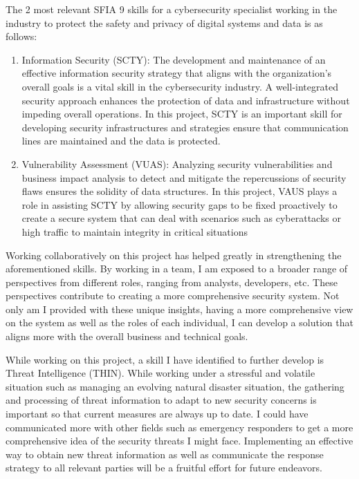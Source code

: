 \documentclass[a4paper, 11pt]{report}
\begin{document}
\begin{enumerate}
The 2 most relevant SFIA 9 skills for a cybersecurity specialist working in the industry to protect the safety and privacy of digital systems and data is as follows:

\begin{enumerate}

	\item Information Security (SCTY): The development and maintenance of an effective information security strategy that aligns with the organization's overall goals is a vital skill in the cybersecurity industry. A well-integrated security approach enhances the protection of data and infrastructure without impeding overall operations. In this project, SCTY is an important skill for developing security infrastructures and strategies ensure that communication lines are maintained and the data is protected.

	\item Vulnerability Assessment (VUAS): Analyzing security vulnerabilities and business impact analysis to detect and mitigate the repercussions of security flaws ensures the solidity of data structures. In this project, VAUS plays a role in assisting SCTY by allowing security gaps to be fixed proactively to create a secure system that can deal with scenarios such as cyberattacks or high traffic to maintain integrity in critical situations

\end{enumerate}

Working collaboratively on this project has helped greatly in strengthening the aforementioned skills. By working in a team, I am exposed to a broader range of perspectives from different roles, ranging from analysts, developers, etc. These perspectives contribute to creating a more comprehensive security system. Not only am I provided with these unique insights, having a more comprehensive view on the system as well as the roles of each individual, I can develop a solution that aligns more with the overall business and technical goals.

While working on this project, a skill I have identified to further develop is Threat Intelligence (THIN). While working under a stressful and volatile situation such as managing an evolving natural disaster situation, the gathering and processing of threat information to adapt to new security concerns is important so that current measures are always up to date. I could have communicated more with other fields such as emergency responders to get a more comprehensive idea of the security threats I might face. Implementing an effective way to obtain new threat information as well as communicate the response strategy to all relevant parties will be a fruitful effort for future endeavors.


\end{enumerate}
\end{document}
